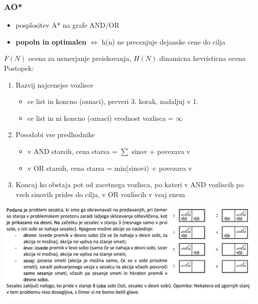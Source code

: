 \subsubsection{AO*}
\begin{itemize}[noitemsep,topsep=0pt,leftmargin=*]
    \item posplositev A* na grafe AND/OR
    \item \textbf{popoln in optimalen} $\Leftrightarrow$ h(n) ne precenjuje dejanske cene do cilja
\end{itemize}
$F(N)$ ocena za usmerjanje preiskovanja, $H(N)$ dinamicna hevristicna ocena\\
Postopek:
\begin{enumerate}[noitemsep,topsep=0pt,leftmargin=*]
    \item Razvij najcenejse vozlisce
    \begin{itemize}[noitemsep,topsep=0pt,leftmargin=*]
        \item ce list in koncno (oznaci), preveri 3. korak, nadaljuj v 1.
        \item ce list in ni koncno (oznaci) vrednost vozlisca = $\infty$
    \end{itemize}
    \item Posodobi vse predhodnike
    \begin{itemize}[noitemsep,topsep=0pt,leftmargin=*]
        \item v AND starsih, cena starsa = $\sum$ sinov + povezava v
        \item v OR starsih, cena starsa = min(sinovi) + povezava v
    \end{itemize}
    \item Koncaj ko obstaja pot od zacetnega vozlisca, po kateri v AND vozliscih po vseh sinovih prides do cilja, v OR vozliscih v vsaj enem
\end{enumerate}
\includegraphics[width=\columnwidth]{images/nedeterminizem_ao2.png}\\
